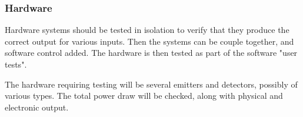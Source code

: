 \subsubsection{\label{sec:method:proposed-verification-procedure:hardware}Hardware}
Hardware systems should be tested in isolation to verify that they produce the correct output for various inputs. Then the systems can be couple together, and software control added. The hardware is then tested as part of the software "user tests".

The hardware requiring testing will be several emitters and detectors, possibly of various types. The total power draw will be checked, along with physical and electronic output.
